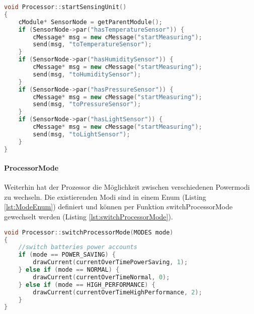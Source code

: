 \begin{minipage}{\textwidth}
\begin{lstlisting}[language=C++, label=lst:startSensingUnit, caption=startSensingUnit()]
void Processor::startSensingUnit()
{
    cModule* SensorNode = getParentModule();
    if (SensorNode->par("hasTemperatureSensor")) {
        cMessage* msg = new cMessage("startMeasuring");
        send(msg, "toTemperatureSensor");
    }
    if (SensorNode->par("hasHumiditySensor")) {
        cMessage* msg = new cMessage("startMeasuring");
        send(msg, "toHumiditySensor");
    }
    if (SensorNode->par("hasPressureSensor")) {
        cMessage* msg = new cMessage("startMeasuring");
        send(msg, "toPressureSensor");
    }
    if (SensorNode->par("hasLightSensor")) {
        cMessage* msg = new cMessage("startMeasuring");
        send(msg, "toLightSensor");
    }
}
\end{lstlisting}
\end{minipage}
\paragraph{ProcessorMode}

Weiterhin hat der Prozessor die Möglichkeit zwischen verschiedenen Powermodi zu wechseln. Die existierenden Modi sind in einem Enum (Listing \ref{lst:ModeEnum}) definiert und können per Funktion switchProcessorMode gewechselt werden (Listing \ref{lst:switchProcessorMode}).

\begin{minipage}{\textwidth}
\begin{lstlisting}[language=C++, label=lst:switchProcessorMode, caption=switchProcessorMode()]
void Processor::switchProcessorMode(MODES mode)
{
    //switch batteries power accounts
    if (mode == POWER_SAVING) {
        drawCurrent(currentOverTimePowerSaving, 1);
    } else if (mode == NORMAL) {
        drawCurrent(currentOverTimeNormal, 0);
    } else if (mode == HIGH_PERFORMANCE) {
        drawCurrent(currentOverTimeHighPerformance, 2);
    }
}
\end{lstlisting}
\end{minipage}

